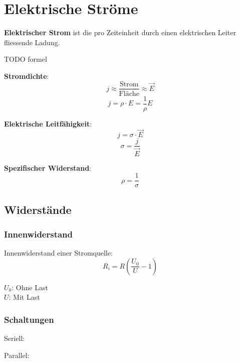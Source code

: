 \section{Elektrische Ströme}

\textbf{Elektrischer Strom} ist die pro Zeiteinheit durch einen elektrischen Leiter
fliessende Ladung.

TODO formel

\textbf{Stromdichte}:
\[
	j \approx \frac{\textrm{Strom}}{\textrm{Fläche}} \approx \vec{E}
\]\[
	j = \rho \cdot E = \frac{1}{\rho}E
\]

\textbf{Elektrische Leitfähigkeit}:
\[
	j = \sigma \cdot \vec{E}
\]\[
	\sigma = \frac{j}{\vec{E}}
\]

\textbf{Spezifischer Widerstand}:
\[
	\rho = \frac{1}{\sigma}
\]

\subsection{Widerstände}

\subsubsection{Innenwiderstand}

Innenwiderstand einer Stromquelle:
\[
	R_i = R \left(\frac{U_0}{U} - 1\right)
\]

$U_0$: Ohne Last\\
$U$: Mit Last

\subsubsection{Schaltungen}

Seriell:



Parallel:


